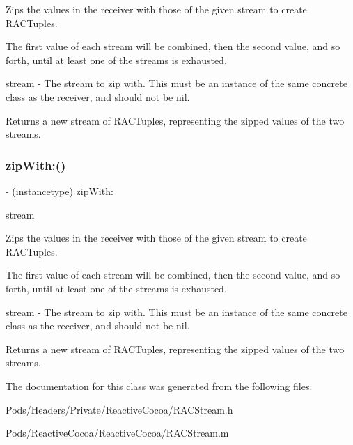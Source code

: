 Zips the values in the receiver with those of the given stream to create R\+A\+C\+Tuples.

The first value of each stream will be combined, then the second value, and so forth, until at least one of the streams is exhausted.

stream -\/ The stream to zip with. This must be an instance of the same concrete class as the receiver, and should not be {\ttfamily nil}.

Returns a new stream of R\+A\+C\+Tuples, representing the zipped values of the two streams. \mbox{\label{interface_r_a_c_stream_a6d06fc682aaa557fbe33af0658988618}} 
\subsubsection{\texorpdfstring{zip\+With\+:()}{zipWith:()}\hspace{0.1cm}{\footnotesize\ttfamily [3/3]}}
{\footnotesize\ttfamily -\/ (instancetype) zip\+With\+: \begin{DoxyParamCaption}\item[{(\mbox{\hyperlink{interface_r_a_c_stream}{R\+A\+C\+Stream}} $\ast$)}]{stream }\end{DoxyParamCaption}}

Zips the values in the receiver with those of the given stream to create R\+A\+C\+Tuples.

The first value of each stream will be combined, then the second value, and so forth, until at least one of the streams is exhausted.

stream -\/ The stream to zip with. This must be an instance of the same concrete class as the receiver, and should not be {\ttfamily nil}.

Returns a new stream of R\+A\+C\+Tuples, representing the zipped values of the two streams. 

The documentation for this class was generated from the following files\+:\begin{DoxyCompactItemize}
\item 
Pods/\+Headers/\+Private/\+Reactive\+Cocoa/R\+A\+C\+Stream.\+h\item 
Pods/\+Reactive\+Cocoa/\+Reactive\+Cocoa/R\+A\+C\+Stream.\+m\end{DoxyCompactItemize}
